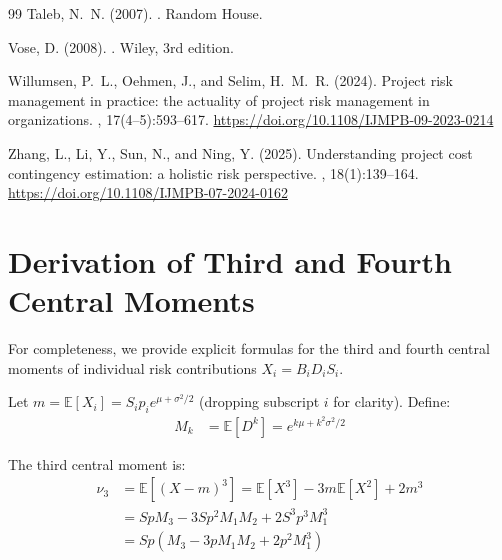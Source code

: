 \documentclass[12pt,a4paper]{article}
\theoremstyle{definition}
\theoremstyle{remark}
\newcommand{\E}{\mathbb{E}}
\begin{document}
\begin{thebibliography}{99}
Taleb, N.~N. (2007).
.
\newblock Random House.

Vose, D. (2008).
.
\newblock Wiley, 3rd edition.

Willumsen, P.~L., Oehmen, J., and Selim, H.~M.~R. (2024).
\newblock Project risk management in practice: the actuality of project risk management in organizations.
, 17(4--5):593--617.
\newblock \url{https://doi.org/10.1108/IJMPB-09-2023-0214}

Zhang, L., Li, Y., Sun, N., and Ning, Y. (2025).
\newblock Understanding project cost contingency estimation: a holistic risk perspective.
, 18(1):139--164.
\newblock \url{https://doi.org/10.1108/IJMPB-07-2024-0162}

\end{thebibliography}


\appendix

\section{Derivation of Third and Fourth Central Moments}
\label{app:moments}

For completeness, we provide explicit formulas for the third and fourth central moments of individual risk contributions $X_i = B_i D_i S_i$.

Let $m = \E[X_i] = S_i p_i e^{\mu + \sigma^2/2}$ (dropping subscript $i$ for clarity). Define:
\begin{align}
    M_k &= \E[D^k] = e^{k\mu + k^2\sigma^2/2}
\end{align}

The third central moment is:
\begin{align}
    \nu_3 &= \E[(X - m)^3] = \E[X^3] - 3m\E[X^2] + 2m^3 \\
    &= S p M_3 - 3 S p^2 M_1 M_2 + 2 S^3 p^3 M_1^3 \\
    &= S p \left( M_3 - 3 p M_1 M_2 + 2 p^2 M_1^3 \right)
\end{align}
\end{document}
